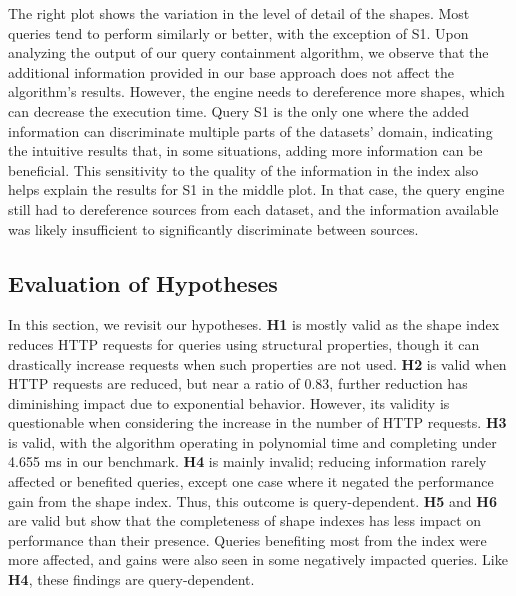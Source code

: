 The right plot shows the variation in the level of detail of the shapes.
Most queries tend to perform similarly or better, with the exception of S1.
Upon analyzing the output of our query containment algorithm, we observe that the additional information provided in our base approach does not affect the algorithm’s results.
However, the engine needs to dereference more shapes, which can decrease the execution time.
Query S1 is the only one where the added information can discriminate multiple parts of the datasets' domain, indicating the intuitive results that, in some situations, adding more information can be beneficial.
This sensitivity to the quality of the information in the index also helps explain the results for S1 in the middle plot. 
In that case, the query engine still had to dereference sources from each dataset, and the information available was likely insufficient to significantly discriminate between sources.

\subsection{Evaluation of Hypotheses}
In this section, we revisit our hypotheses.
\textbf{H1} is mostly valid as the shape index reduces HTTP requests for queries using structural properties, though it can drastically increase requests when such properties are not used.
\textbf{H2} is valid when HTTP requests are reduced, but near a ratio of 0.83, further reduction has diminishing impact due to exponential behavior.
However, its validity is questionable when considering the increase in the number of HTTP requests.
\textbf{H3} is valid, with the algorithm operating in polynomial time and completing under 4.655 ms in our benchmark.
\textbf{H4} is mainly invalid; reducing information rarely affected or benefited queries, except one case where it negated the performance gain from the shape index.
Thus, this outcome is query-dependent.
\textbf{H5} and \textbf{H6} are valid but show that the completeness of shape indexes has less impact on performance than their presence.
Queries benefiting most from the index were more affected, and gains were also seen in some negatively impacted queries.
Like \textbf{H4}, these findings are query-dependent.

